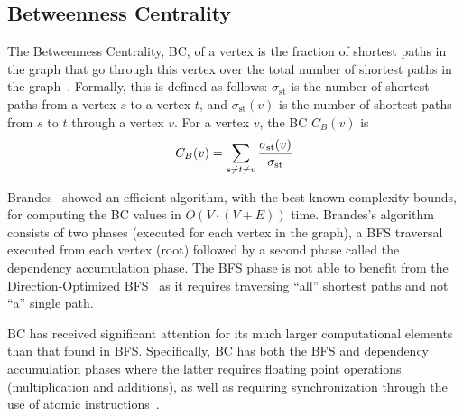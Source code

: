 


\subsection{Betweenness Centrality}
The Betweenness Centrality, BC, of a vertex is the fraction of shortest paths in the graph that go through this vertex over the total number of shortest paths in the graph~\cite{Freeman1977}. Formally, this is defined as follows: $\sigma_\text{st}$ is the number of shortest paths from a vertex $s$ to a vertex $t$, and $\sigma_\text{st}(v)$ is the number of shortest paths from $s$ to $t$ through a vertex $v$. For a vertex $v$, the BC $C_B(v)$ is
\begin{equation}
C_B(v) = \sum_{s \neq t \neq v}\frac{\sigma_\text{st}(v)}{\sigma_\text{st}} \\
\end{equation}

Brandes~\cite{Brandes2001} showed an efficient algorithm, with the best known complexity bounds, for computing the BC values in $O(V\cdot (V+E))$ time. Brandes's algorithm  consists of two phases (executed for each vertex in the graph),  a BFS traversal executed from each vertex (root) followed by a second phase called the dependency accumulation phase. The BFS phase is not able to benefit from the Direction-Optimized BFS~\cite{beamer2012direction} as it requires traversing ``all'' shortest paths and not ``a'' single path.

BC has received significant attention for its much larger computational elements  than that found in BFS\@. Specifically, BC has both the BFS and dependency accumulation phases where the latter requires floating point operations (multiplication and additions), as well as requiring synchronization through the use of atomic instructions~\cite{MadduriBaderParallel,green2013faster}.
